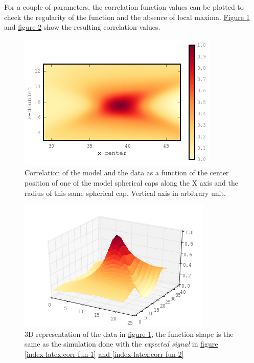 \documentclass[A4paperpaper,11pt,english]{sphinxmanual}
\begin{document}
For a couple of parameters, the correlation function values can be plotted
to check the regularity of the function and the absence of local maxima. \hyperref[index-latex:gof2d]{Figure  \ref*{index-latex:gof2d}} and \hyperref[index-latex:gof3d]{figure  \ref*{index-latex:gof3d}} show the resulting correlation values.
\begin{figure}[htbp]
\centering
\capstart

\includegraphics[width=0.600\linewidth]{gof-2d-doublets.png}
\caption{Correlation of the model and the data as a function of the center position
of one of the model spherical caps along the X axis and the radius of this
same spherical cap. Vertical axis in arbitrary unit.}\label{index-latex:gof2d}\end{figure}
\begin{figure}[htbp]
\centering
\capstart

\includegraphics[width=0.600\linewidth]{gof-3d-doublets.png}
\caption{3D representation of the data in \hyperref[index-latex:gof2d]{figure  \ref*{index-latex:gof2d}}, the function shape is the same as the simulation done with the \emph{expected signal} in
\hyperref[index-latex:corr-fun-1]{figure  \ref*{index-latex:corr-fun-1}} \hyperref[index-latex:corr-fun-2]{and  \ref*{index-latex:corr-fun-2}}}\label{index-latex:gof3d}\end{figure}
\end{document}

